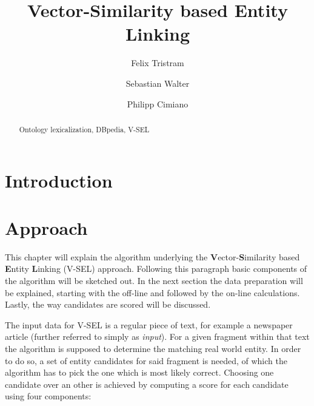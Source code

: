 \documentclass[runningheads,a4paper]{llncs}
\newcommand{\keywords}[1]{\par\addvspace\baselineskip
\noindent\keywordname\enspace\ignorespaces#1}
\begin{document}
\mainmatter  %

\newcommand{\acronym}{V-SEL}

\title{Vector-Similarity based Entity Linking}

\author{Felix Tristram \and Sebastian Walter \and Philipp Cimiano}



\maketitle


\begin{abstract}


\keywords{Ontology lexicalization, DBpedia, \acronym{}}
\end{abstract}

\section{Introduction}\label{sec:introduction}
\lipsum[1-4]

\section{Approach}\label{sec:approach}
This chapter will explain the algorithm underlying the \textbf{V}ector-\textbf{S}imilarity based \textbf{E}ntity \textbf{L}inking {(\acronym )} approach. Following this paragraph basic components of the algorithm will be sketched out. In the next section the data preparation will be explained, starting with the off-line and followed by the on-line calculations. Lastly, the way candidates are scored will be discussed.

The input data for {\acronym} is a regular piece of text, for example a newspaper article (further referred to simply as \textit{input}). For a given fragment within that text the algorithm is supposed to determine the matching real world entity. In order to do so, a set of entity candidates for said fragment is needed, of which the algorithm has to pick the one which is most likely correct. Choosing one candidate over an other is achieved by computing a score for each candidate using four components:
\end{document}
